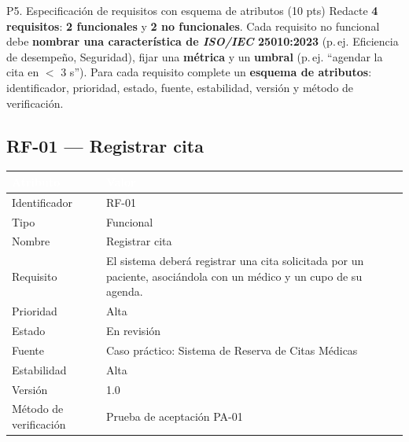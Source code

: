 \documentclass[11pt,a4paper,oneside]{article}
\newcommand{\hd}[1]{\cellcolor{darkblue}\textbf{\textcolor{white}{\small\sffamily #1}}}
\begin{document}
\newpage


\begin{tarea}{P5. Especificaci\'on de requisitos con esquema de atributos \hfill (10 pts)}
Redacte \textbf{4 requisitos}: \textbf{2 funcionales} y \textbf{2 no funcionales}. Cada requisito no funcional debe \textbf{nombrar una caracter\'istica de \textit{ISO/IEC} 25010:2023} (p.\,ej. Eficiencia de desempe\~no, Seguridad), fijar una \textbf{m\'etrica} y un \textbf{umbral} (p.\,ej. ``agendar la cita en $<$ 3 s''). Para cada requisito complete un \textbf{esquema de atributos}: identificador, prioridad, estado, fuente, estabilidad, versi\'on y m\'etodo de verificaci\'on.
\end{tarea}

\subsection*{RF-01 --- Registrar cita}
\begin{tabularx}{\linewidth}{@{}L{4.0cm} X@{}}
\toprule
\hd{Atributo} & \hd{Valor}\\
\midrule
Identificador & RF-01\\
 Tipo & Funcional\\
Nombre & Registrar cita\\
 Requisito & El sistema deber\'a registrar una cita solicitada por un paciente, asoci\'andola con un m\'edico y un cupo de su agenda.\\
Prioridad & Alta\\
 Estado & En revisi\'on\\
Fuente & Caso pr\'actico: Sistema de Reserva de Citas M\'edicas\\
 Estabilidad & Alta\\
Versi\'on & 1.0\\
 M\'etodo de verificaci\'on & Prueba de aceptaci\'on PA-01\\
\bottomrule
\end{tabularx}
\end{document}

